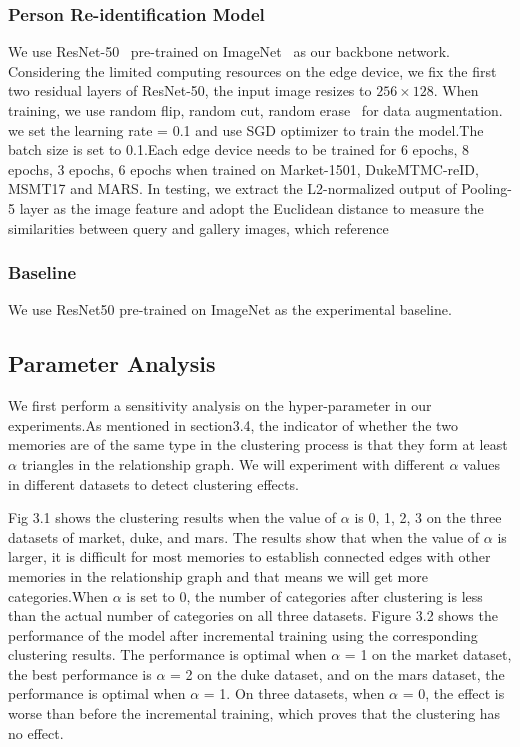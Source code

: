 \documentclass{article}
\begin{document}
\subsubsection{Person Re-identification Model}
We use ResNet-50~\cite{he2016deep} pre-trained on ImageNet~\cite{deng2009imagenet} as our backbone network. Considering the limited computing resources on the edge device, we fix the first two residual layers of ResNet-50, the input image resizes to $256\times128$. When training, we use random flip, random cut, random erase~\cite{zhong2017random} for data augmentation. we set the learning rate = 0.1 and use SGD optimizer to train the model.The batch size is set to 0.1.Each edge device needs to be trained for 6 epochs, 8 epochs, 3 epochs, 6 epochs when trained on Market-1501, DukeMTMC-reID, MSMT17 and MARS. In testing, we extract the L2-normalized output of Pooling-5 layer as the image feature and adopt the Euclidean distance to measure the similarities between query and gallery images, which reference ~\cite{zhong2019invariance}

\subsubsection{Baseline}
We use ResNet50 pre-trained on ImageNet as the experimental baseline.

\subsection{Parameter Analysis}
We first perform a sensitivity analysis on the hyper-parameter in our experiments.As mentioned in section3.4, the indicator of whether the two memories are of the same type in the clustering process is that they form at least $\alpha$ triangles in the relationship graph. We will experiment with different $\alpha$ values in different datasets to detect clustering effects.

Fig 3.1 shows the clustering results when the value of $\alpha$ is 0, 1, 2, 3 on the three datasets of market, duke, and mars. The results show that when the value of $\alpha$ is larger, it is difficult for most memories to establish connected edges with other memories in the relationship graph and that means we will get more categories.When $\alpha$ is set to 0, the number of categories after clustering is less than the actual number of categories on all three datasets. Figure 3.2 shows the performance of the model after incremental training using the corresponding clustering results. The performance is optimal when $\alpha$ = 1 on the market dataset, the best performance is $\alpha$ = 2 on the duke dataset, and on the mars dataset, the performance is optimal when $\alpha$ = 1. On three datasets, when $\alpha$ = 0, the effect is worse than before the incremental training, which proves that the clustering has no effect.
\end{document}
